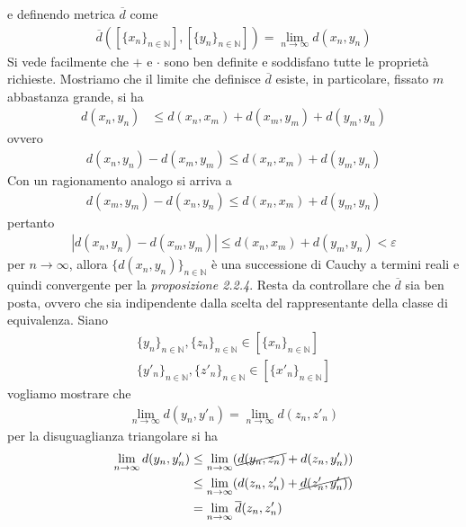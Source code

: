 \documentclass{article}
\numberwithin{equation}{subsection}
\begin{document}
e definendo metrica $\overline{d}$ come 
\begin{align*}
    \overline{d}\left([\{x_n\}_{n \in \mathbb{N}}], [\{y_n\}_{n \in \mathbb{N}}]\right) = \lim_{n \rightarrow \infty}d(x_n, y_n) 
\end{align*}
Si vede facilmente che $+$ e $\cdot$ sono ben definite e soddisfano tutte le proprietà richieste. Mostriamo che il limite che definisce $\overline{d}$ esiste, in particolare, fissato $m$ abbastanza grande, si ha 
\begin{align*}
    d(x_n, y_n) &\leq d(x_n, x_m) + d(x_m, y_m) + d(y_m, y_n) 
\end{align*}
ovvero 
\begin{align*}
    d(x_n, y_n) - d(x_m, y_m) \leq d(x_n, x_m) + d(y_m, y_n) 
\end{align*}
Con un ragionamento analogo si arriva a 
\begin{align*}
    d(x_m, y_m) - d(x_n, y_n) \leq d(x_n, x_m) + d(y_m, y_n)  
\end{align*}
pertanto 
\begin{align*}
    |d(x_n, y_n) - d(x_m, y_m)| \leq d(x_n, x_m) + d(y_m, y_n) < \varepsilon 
\end{align*}
per $n \rightarrow \infty$, allora $\{d(x_n, y_n)\}_{n \in \mathbb{N}}$ è una successione di Cauchy a termini reali e quindi convergente per la \textit{proposizione 2.2.4}. Resta da controllare che $\overline{d}$ sia ben posta, ovvero che sia indipendente dalla scelta del rappresentante della classe di equivalenza. Siano 
\begin{align*}
    \{y_n\}_{n \in \mathbb{N}}, \{z_n\}_{n \in \mathbb{N}} \in [\{x_n\}_{n \in \mathbb{N}}]  \\
    \{y'_n\}_{n \in \mathbb{N}}, \{z'_n\}_{n \in \mathbb{N}} \in [\{x'_n\}_{n \in \mathbb{N}}] 
\end{align*}
vogliamo mostrare che 
\begin{align*}
    \lim_{n \rightarrow \infty}{d}(y_n, y'_n) = \lim_{n \rightarrow \infty}{d}(z_n, z'_n)  
\end{align*}
per la disuguaglianza triangolare si ha 
\begin{align*}
    \lim_{n \rightarrow \infty}{d}(y_n, y'_n) &\leq \lim_{n \rightarrow \infty} (\cancel{{d}(y_n, z_n)} + {d}(z_n, y'_n))  \\
    &\leq \lim_{n \rightarrow \infty}({d}(z_n, z'_n) + \cancel{{d}(z'_n, y'_n)})  \\
    &= \lim_{n \rightarrow \infty}\overline{d}(z_n, z'_n) 
\end{align*}
\end{document}
